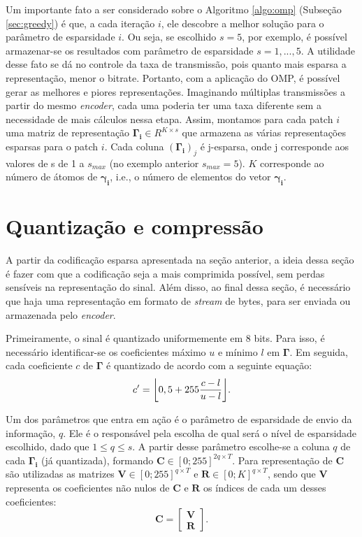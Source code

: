 \documentclass[cic,tc]{iiufrgs}
\renewcommand{\vec}[1]{\bm{#1}}
\newcommand{\mat}[1]{\bm{#1}}
\DeclarePairedDelimiter{\floor}{\lfloor}{\rfloor}
\begin{document}
Um importante fato a ser considerado sobre o Algoritmo \ref{algo:omp} (Subseção \ref{sec:greedy}) 
é que, a cada iteração $i$,
ele descobre a melhor solução para o parâmetro de esparsidade $i$. Ou seja, se escolhido $s=5$,
por exemplo, é possível armazenar-se os resultados com parâmetro de esparsidade $s=1,...,5$. 
A utilidade desse fato se dá no controle da taxa de transmissão, pois quanto mais esparsa a 
representação, menor o bitrate. 
Portanto, com a aplicação do OMP, é possível gerar as melhores e piores representações.
Imaginando múltiplas transmissões a partir do mesmo \textit{encoder}, cada uma poderia ter 
uma taxa diferente sem a necessidade de mais cálculos nessa etapa.
Assim, montamos para cada patch $i$ uma matriz de representação $\mat{\Gamma_i} \in R^{K \times s}$
que armazena as várias representações esparsas para o patch $i$. Cada coluna $(\mat{\Gamma_i})_j$ é 
j-esparsa, onde j corresponde aos valores de s de 1 a $s_{max}$ (no exemplo anterior $s_{max} = 5$).
$K$ corresponde ao número de átomos de $\vec{\gamma_i}$, 
i.e., o número de elementos do vetor $\vec{\gamma_i}$. 

\section{Quantização e compressão}
A partir da codificação esparsa apresentada na seção anterior, a ideia dessa seção é 
fazer com que a codificação seja a mais comprimida possível, sem perdas sensíveis
na representação do sinal.
Além disso, ao final dessa seção, é necessário que haja uma representação em formato de 
\textit{stream} de bytes, para ser enviada ou armazenada pelo \textit{encoder}.

Primeiramente, o sinal é quantizado uniformemente em 8 bits. 
Para isso, é necessário identificar-se os coeficientes máximo $u$ e mínimo $l$ em $\mat{\Gamma}$.
Em seguida, cada coeficiente $c$ de $\mat{\Gamma}$ é quantizado de acordo com a seguinte equação:
\begin{equation*}
    c' = \floor*{0,5 + 255\frac{c - l}{u - l}}.
\end{equation*}

Um dos parâmetros que entra em ação é o parâmetro de esparsidade de envio da informação, $q$. 
Ele é o responsável pela escolha de qual será o nível de esparsidade escolhido,
dado que $1 \le q \le s$.
A partir desse parâmetro escolhe-se a coluna $q$ de cada $\mat{\Gamma_i}$ (já quantizada), 
formando $\mat{C} \in {[0;255]}^{2q \times T}$.
Para representação de $\mat{C}$ são utilizadas as matrizes $\mat{V} \in [0;255]^{q \times T}$ e
$\mat{R} \in [0;K]^{q \times T}$, sendo que $\mat{V}$ representa os coeficientes não nulos de
$\mat{C}$ e $\mat{R}$ os índices de cada um desses coeficientes:
\begin{equation*}
    \mat{C} = 
    \begin{bmatrix}
        \mat{V} \\
        \mat{R}
    \end{bmatrix}.
\end{equation*}
\end{document}
